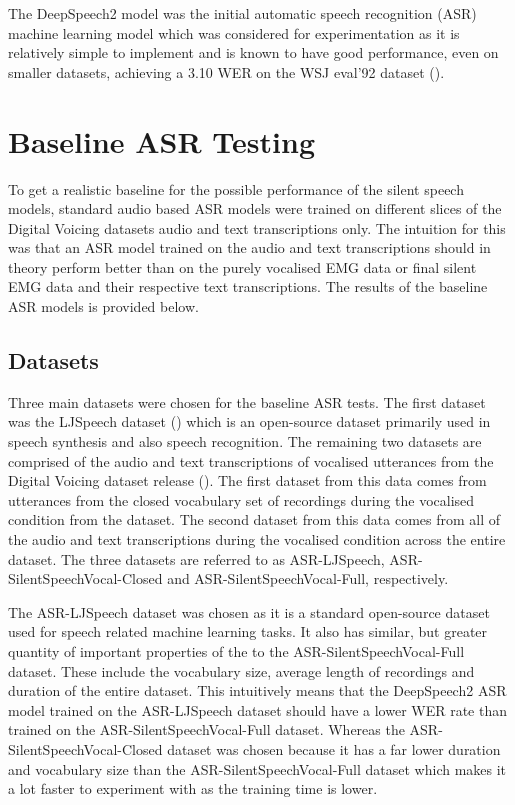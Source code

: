 The DeepSpeech2 model was the initial automatic speech recognition (ASR) machine
learning model which was considered for experimentation as it is relatively simple to
implement and is known to have good performance, even on smaller datasets, achieving
a 3.10 WER on the WSJ eval'92 dataset
(\cite{DS2_original}).

\section{Baseline ASR Testing}

To get a realistic baseline for the possible performance of the silent
speech models, standard audio based ASR models were trained on different
slices of the Digital Voicing datasets audio and text transcriptions only.
The intuition for this was that an ASR model trained on the audio and text
transcriptions should in theory perform better than on the purely vocalised
EMG data or final silent EMG data and their respective text transcriptions.
The results of the baseline ASR models is provided below.

\subsection{Datasets}

Three main datasets were chosen for the baseline ASR tests. The first dataset
was the LJSpeech dataset
(\cite{ljspeech17})
which is an open-source dataset primarily used in
speech synthesis and also speech recognition. The remaining two datasets
are comprised of the audio and text transcriptions of vocalised
utterances from the Digital Voicing dataset release (\cite{gaddy2020digital}).
The first dataset from this data comes from utterances from the closed
vocabulary set of recordings during the vocalised condition from the dataset.
The second dataset from this data comes from
all of the audio and text transcriptions during the vocalised condition across
the entire dataset. The three datasets are referred to as
ASR-LJSpeech, ASR-SilentSpeechVocal-Closed and ASR-SilentSpeechVocal-Full,
respectively.

The ASR-LJSpeech dataset was chosen as it is a standard open-source dataset
used for speech related machine learning tasks. It also has similar, but greater
quantity of important properties of the 
to the ASR-SilentSpeechVocal-Full dataset. These include the vocabulary size,
average length of recordings and duration of the entire dataset. This intuitively
means that the DeepSpeech2 ASR model trained on the ASR-LJSpeech dataset should
have a lower WER rate than trained on the ASR-SilentSpeechVocal-Full dataset.
Whereas the ASR-SilentSpeechVocal-Closed dataset was chosen because it has
a far lower duration and vocabulary size than the ASR-SilentSpeechVocal-Full
dataset which makes it a lot faster to experiment with as the training time is
lower.

